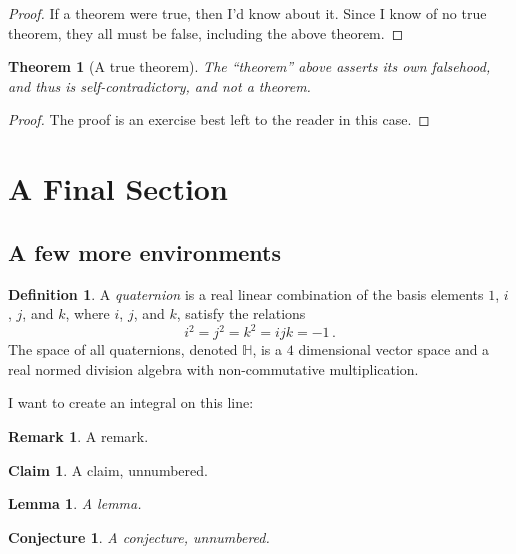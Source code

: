 \documentclass[11pt,letterpaper,pdftex]{amsart}
\theoremstyle{definition}
\newtheorem{dfn}{Definition}[section]
\newtheorem{rmk}{Remark}[section]
\newtheorem*{clm*}{Claim}
\theoremstyle{plain}
\newtheorem*{thm*}{Theorem}
\newtheorem*{cnj*}{Conjecture}
\newtheorem{lem}{Lemma}[section]
\newcommand{\RR}{\mathbb{R}}
\newcommand{\ud}{\mathrm{d}} %
\newcommand{\dif}{\, \ud} %
\newcommand{\HH}{\mathbb{H}} %
\begin{document}
\begin{proof} If a theorem were true, then I'd know about it.  Since I know of no true theorem, they all must be false, including the above theorem.
\end{proof}

\begin{thm*}[A true theorem] The ``theorem'' above asserts its own falsehood, and thus is self-contradictory, and not a theorem.
\end{thm*}

\begin{proof} \textcolor{RoyalPurple}{The proof is an exercise best left to the reader in this case.}
\end{proof}

\vfill

\section{A Final Section}

\subsection{A few more environments}
\begin{dfn} A \emph{quaternion} is a real linear combination of the basis elements $1$, $i$, $j$, and $k$, where $i$, $j$, and $k$, satisfy the relations
\[i^2=j^2=k^2=ijk=-1 \, .\]
The space of all quaternions, denoted $\HH$, is a $4$ dimensional vector space and a real normed division algebra with non-commutative multiplication.
\end{dfn}

I want to create an integral on this line: %

\begin{rmk} A remark.
\end{rmk}

\begin{clm*} A claim, unnumbered.
\end{clm*}

\begin{lem} A lemma.
\end{lem}

\begin{cnj*} A conjecture, unnumbered.
\end{cnj*}
\end{document}
